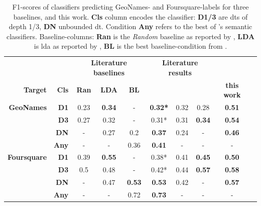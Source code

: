 \begin{table}[H]
	\centering
	\begin{tabular}{rr|ccc|ccc|cc} 
	& & \multicolumn{3}{c|}{\footnotesize \textbf{Literature baselines}} & \multicolumn{3}{c|}{\footnotesize \textbf{Literature results}} & \\ \noalign{\vskip-2pt}
	\textbf{Target} &
	  \textbf{Cls} &
	  \textbf{Ran} &
	  \textbf{LDA} &
	  \textbf{BL} &
	  \textbf{\cite{Derrac2015}} &
	  \textbf{\cite{Ager2018}} &
	  \textbf{\cite{Alshaikh2020}} &
	  \textbf{this work} \\ \midrule
	\textbf{GeoNames}    & \textbf{D1}  & 0.23 & \textbf{0.34} & -             & \textbf{0.32*} & 0.32 & 0.28          & \textbf{0.51} \\
						 & \textbf{D3}  & 0.27 & 0.32          & -             & 0.31*          & 0.31 & \textbf{0.34} & \textbf{0.54} \\
						 & \textbf{DN}  & -    & 0.27          & 0.2           & \textbf{0.37}  & 0.24 & -             & \textbf{0.46} \\
	\multicolumn{1}{l}{} & \textbf{Any} & -    & -             & 0.36          & \textbf{0.41}  & -    & -             & -            \\
	\textbf{Foursquare}  & \textbf{D1}  & 0.39 & \textbf{0.55} & -             & 0.38*          & 0.41 & \textbf{0.45} & \textbf{0.50} \\
	& \textbf{D3}  & 0.5  & 0.48          & -             & 0.42*          & 0.44 & \textbf{0.57} & \textbf{0.58} \\
	& \textbf{DN}  & -    & 0.47          & \textbf{0.53} & \textbf{0.53}  & 0.42 & -             & \textbf{0.57} \\
\multicolumn{1}{l}{} & \textbf{Any} & -    & -             & 0.72          & \textbf{0.73}  & -    & -             & -             
	\end{tabular}%
	\caption[F1-scores of classifiers for placetype-taxonomies of \mainalgos and this work.]{F1-scores of classifiers predicting GeoNames- and Foursquare-labels for three baselines, \mainalgos and this work. \textbf{Cls} column encodes the classifier: \textbf{D1/3} are \glspl{dt} of depth 1/3, \textbf{DN} unbounded \gls{dt}. Condition \textbf{Any} refers to the best of \cite{Derrac2015}'s  semantic classifiers. \hspace{1ex}
	Baseline-columns: \textbf{Ran} is the \textit{Random} baseline as reported by \cite{Alshaikh2020}, \textbf{LDA} is \acrshort{lda} as reported by \cite{Ager2018}, \textbf{BL} is the best baseline-condition from \cite{Derrac2015}. \hspace{1ex}
}
\end{table}
